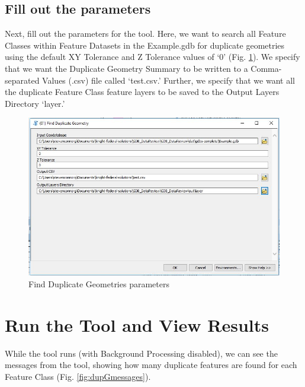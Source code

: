 \documentclass[openany]{book}
\theoremstyle{definition}
\theoremstyle{definition}
\theoremstyle{definition}
\theoremstyle{remark}
\begin{document}
\subsection{Fill out the parameters}\label{fill-out-the-parameters-3}

Next, fill out the parameters for the tool. Here, we want to search all
Feature Classes within Feature Datasets in the Example.gdb for duplicate
geometries using the default XY Tolerance and Z Tolerance values of `0'
(Fig. \ref{fig:dupGparams}). We specify that we want the Duplicate
Geometry Summary to be written to a Comma-separated Values (.csv) file
called `test.csv.' Further, we specify that we want all the duplicate
Feature Class feature layers to be saved to the Output Layers Directory
`layer.'

\begin{figure}[H]

{\centering \includegraphics{figures/dupG-params} 

}

\caption{Find Duplicate Geometries parameters}\label{fig:dupGparams}
\end{figure}

\section{Run the Tool and View
Results}\label{run-the-tool-and-view-results-3}

While the tool runs (with Background Processing disabled), we can see
the messages from the tool, showing how many duplicate features are
found for each Feature Class (Fig. \ref{fig:dupGmessages}).
\end{document}
